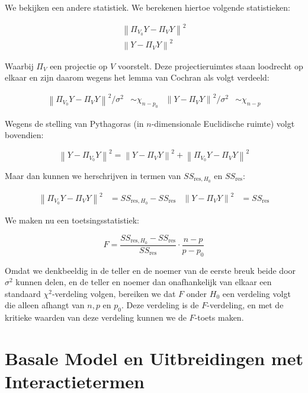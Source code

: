 \documentclass[a4paper]{report}
\newcommand{\norm}[1]{\left\lVert#1\right\rVert}
\begin{document}
  We bekijken een andere statistiek. We berekenen hiertoe volgende statistieken:
  
  \begin{align}
  \norm{\Pi_{V_0}Y - \Pi_{V}Y}^2\\
  \norm{Y - \Pi_{V}Y}^2
  \end{align}   
  
  Waarbij $\Pi_V$ een projectie op $V$ voorstelt. Deze projectieruimtes staan loodrecht op elkaar en zijn daarom wegens het lemma van Cochran als volgt verdeeld:
  
  \begin{align*}
  \norm{\Pi_{V_0}Y - \Pi_{V}Y}^2/\sigma^2 &\sim \chi_{n-p_0} &
  \norm{Y - \Pi_{V}Y}^2/\sigma^2  &\sim \chi_{n-p}
  \end{align*}
  
  Wegens de stelling van Pythagoras (in $n$-dimensionale Euclidische ruimte) volgt bovendien:
  
  \begin{equation*}
  \norm{Y - \Pi_{V_0}Y}^2  = \norm{Y - \Pi_{V}Y}^2 + \norm{\Pi_{V_0}Y - \Pi_{V}Y}^2
  \end{equation*}
  
  Maar dan kunnen we herschrijven in termen van $SS_{\text{res},H_0}$ en $SS_{\text{res}}$:
  
  \begin{align*}
  \norm{\Pi_{V_0}Y - \Pi_{V}Y}^2 &= SS_{\text{res},H_0} - SS_{\text{res}} &
  \norm{Y - \Pi_{V}Y}^2 &= SS_{\text{res}}
  \end{align*}
  
  We maken nu een toetsingsstatistiek:
  
  \begin{equation}
  F = \frac{SS_{\text{res},H_0} - SS_{\text{res}}}{SS_{\text{res}}} \cdot \frac{n-p}{p-p_0}
  \end{equation}
  
  Omdat we denkbeeldig in de teller en de noemer van de eerste breuk beide door $\sigma^2$ kunnen delen, en de teller en noemer dan onafhankelijk van elkaar een standaard $\chi^2$-verdeling volgen, bereiken we dat $F$ onder $H_0$ een verdeling volgt die alleen afhangt van $n,p$ en $p_0$. Deze verdeling is de $F$-verdeling, en met de kritieke waarden van deze verdeling kunnen we de $F$-toets maken.

\chapter{Basale Model en Uitbreidingen met Interactietermen}
\end{document}
